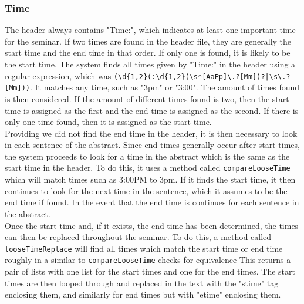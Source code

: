 \documentclass[10pt]{article}
\begin{document}
\begin{multicols}{2}
\subsubsection{Time}
The header always contains "Time:", which indicates at least one important time for the seminar. If two times are found in the header file, they are generally the start time and the end time in that order. If only one is found, it is likely to be the start time. The system finds all times given by "Time:" in the header using a regular expression, which was {{\tt (\textbackslash d\{1,2\}(:\textbackslash d\{1,2\}(\textbackslash s*[AaPp]\textbackslash .?[Mm])?|\textbackslash s\linebreak*[AaPp]\textbackslash .?[Mm]))}}. It matches any time, such as "3pm" or "3:00". The amount of times found is then considered. If the amount of different times found is two, then the start time is assigned as the first and the end time is assigned as the second. If there is only one time found, then it is assigned as the start time.\\
Providing we did not find the end time in the header, it is then necessary to look in each sentence of the abstract. Since end times generally occur after start times, the system proceeds to look for a time in the abstract which is the same as the start time in the header. To do this, it uses a method called {{\tt compareLooseTime}} which will match times such as 3:00PM to 3pm. If it finds the start time, it then continues to look for the next time in the sentence, which it assumes to be the end time if found. In the event that the end time is continues for each sentence in the abstract.\\
Once the start time and, if it exists, the end time has been determined, the times can then be replaced throughout the seminar. To do this, a method called {{\tt looseTimeReplace}} will find all times which match the start time or end time roughly in a similar to {{\tt compareLooseTime}} checks for equivalence This returns a pair of lists with one list for the start times and one for the end times. The start times are then looped through and replaced in the text with the "stime" tag enclosing them, and similarly for end times but with "etime" enclosing them.

\end{multicols}
\end{document}
